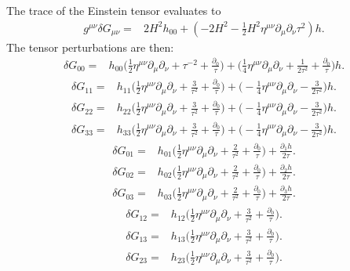 \documentclass[10pt,letterpaper]{article}
\begin{document}
The trace of the Einstein tensor evaluates to 
\begin{align}
g^{\mu\nu}\delta G_{\mu\nu} ={}&2 H^2 h_{00}
 + (-2 H^2
 -  \tfrac{1}{2} H^2 \eta^{\mu \nu} \partial_{\mu} \partial_{\nu} \tau^2) h.
\end{align}
The tensor perturbations are then:
\begin{align}
\delta G_{00}={}&h_{00} \bigg(\tfrac{1}{2} \eta^{\mu \nu} \partial_{\mu} \partial_{\nu}
 + \tau^{-2}
 + \frac{\partial_{0}}{\tau}\bigg)
 + \bigg(\tfrac{1}{4} \eta^{\mu \nu} \partial_{\mu} \partial_{\nu}
 + \frac{1}{2 \tau^2}
 + \frac{\partial_{0}}{\tau}\bigg) h.
\end{align}
\begin{align}
\delta G_{11}={}&h_{11} \bigg(\tfrac{1}{2} \eta^{\mu \nu} \partial_{\mu} \partial_{\nu}
 + \frac{3}{\tau^2}
 + \frac{\partial_{0}}{\tau}\bigg)
 + \bigg(- \tfrac{1}{4} \eta^{\mu \nu} \partial_{\mu} \partial_{\nu}
 -  \frac{3}{2 \tau^2}\bigg) h.
\end{align}
\begin{align}
\delta G_{22}={}&h_{22} \bigg(\tfrac{1}{2} \eta^{\mu \nu} \partial_{\mu} \partial_{\nu}
 + \frac{3}{\tau^2}
 + \frac{\partial_{0}}{\tau}\bigg)
 + \bigg(- \tfrac{1}{4} \eta^{\mu \nu} \partial_{\mu} \partial_{\nu}
 -  \frac{3}{2 \tau^2}\bigg) h.
\end{align}
\begin{align}
\delta G_{33}={}&h_{33} \bigg(\tfrac{1}{2} \eta^{\mu \nu} \partial_{\mu} \partial_{\nu}
 + \frac{3}{\tau^2}
 + \frac{\partial_{0}}{\tau}\bigg)
 + \bigg(- \tfrac{1}{4} \eta^{\mu \nu} \partial_{\mu} \partial_{\nu}
 -  \frac{3}{2 \tau^2}\bigg) h.
\end{align}
\begin{align}
\delta G_{01}={}&h_{01} \bigg(\tfrac{1}{2} \eta^{\mu \nu} \partial_{\mu} \partial_{\nu}
 + \frac{2}{\tau^2}
 + \frac{\partial_{0}}{\tau}\bigg)
 + \frac{\partial_{1} h}{2 \tau}.
\end{align}
\begin{align}
\delta G_{02}={}&h_{02} \bigg(\tfrac{1}{2} \eta^{\mu \nu} \partial_{\mu} \partial_{\nu}
 + \frac{2}{\tau^2}
 + \frac{\partial_{0}}{\tau}\bigg)
 + \frac{\partial_{2} h}{2 \tau}.
\end{align}
\begin{align}
\delta G_{03}={}&h_{03} \bigg(\tfrac{1}{2} \eta^{\mu \nu} \partial_{\mu} \partial_{\nu}
 + \frac{2}{\tau^2}
 + \frac{\partial_{0}}{\tau}\bigg)
 + \frac{\partial_{3} h}{2 \tau}.
\end{align}
\begin{align}
\delta G_{12}={}&h_{12} \bigg(\tfrac{1}{2} \eta^{\mu \nu} \partial_{\mu} \partial_{\nu}
 + \frac{3}{\tau^2}
 + \frac{\partial_{0}}{\tau}\bigg).
\end{align}
\begin{align}
\delta G_{13}={}&h_{13} \bigg(\tfrac{1}{2} \eta^{\mu \nu} \partial_{\mu} \partial_{\nu}
 + \frac{3}{\tau^2}
 + \frac{\partial_{0}}{\tau}\bigg).
\end{align}
\begin{align}
\delta G_{23}={}&h_{23} \bigg(\tfrac{1}{2} \eta^{\mu \nu} \partial_{\mu} \partial_{\nu}
 + \frac{3}{\tau^2}
 + \frac{\partial_{0}}{\tau}\bigg).
\end{align}
\end{document}
